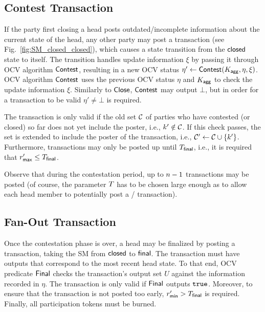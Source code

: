 


\subsection{Contest Transaction} 

If the party first closing a head posts
outdated/incomplete information about the current state of the head,
any other party may post a \mtxContest{} transaction (see
Fig.~\ref{fig:SM_closed_closed}), which causes a state transition from
the $\mathsf{closed}$ state to itself.  The transition handles update
information $\xi$ by passing it through OCV algorithm $\mathsf{Contest}$,
resulting in a new OCV status
$\eta' \gets \mathsf{Contest} (K_{\mathsf{agg}},\eta,\xi)$.  OCV algorithm
$\mathsf{Contest}$ uses the previous OCV status $\eta$ and $K_{\mathsf{agg}}$ to check
the update information $\xi$.  Similarly to $\mathsf{Close}$, $\mathsf{Contest}$
may output $\bot$, but in order for a \mtxContest{} transaction to be
valid $\eta' \neq \bot$ is required.

The \mtxContest{} transaction is only valid if the old set
$\mathcal C$ of parties who have contested (or closed) so far does not yet
include the poster, i.e., $k' \notin \mathcal C$.  If this check
passes, the set is extended to include the poster of the \mtxContest{}
transaction, i.e., $\mathcal C' \gets \mathcal C \cup \{k'\}$.
Furthermore, \mtxContest{} transactions may only be posted up until
$T_{\mathsf{final}}$, i.e., it is required that $r_{\mathsf{max}}' \leq T_{\mathsf{final}}$.

Observe that during the contestation period, up to $n-1$
\mtxContest{} transactions may be posted (of course, the parameter
$T$ has to be chosen large enough as to allow each head member to
potentially post a \mtxClose{}/\mtxContest{} transaction).






\subsection{Fan-Out Transaction}  

Once the contestation phase is over, a head
may be finalized by posting a \mtxFanout{} transaction, taking the SM
from $\mathsf{closed}$ to $\mathsf{final}$.  The \mtxFanout{} transaction must
have outputs that correspond to the most recent head state.  To that
end, OCV predicate $\mathsf{Final}$ checks the transaction's output set $U$
against the information recorded in $\eta$.  The \mtxFanout{}
transaction is only valid if $\mathsf{Final}$ outputs $\mathtt{true}$.  Moreover,
to ensure that the \mtxFanout{} transaction is not posted too early,
$r_{\mathsf{min}}' > T_{\mathsf{final}}$ is required.  Finally, all participation tokens
must be burned.


